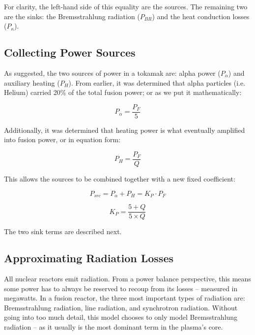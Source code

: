 \documentclass[11pt]{book}
\begin{document}
For clarity, the left-hand side of this equality are the sources. The remaining two are the sinks: the Bremsstrahlung radiation ($P_{BR}$) and the heat conduction losses ($P_\kappa$).

\subsection{Collecting Power Sources}

As suggested, the two sources of power in a tokamak are: alpha power ($P_\alpha$) and auxiliary heating ($P_H$). From earlier, it was determined that alpha particles (i.e. Helium) carried 20\% of the total fusion power; or as we put it mathematically:

\begin{equation}
	\label{eq:palpha}
	P_\alpha = \frac{P_F}{5}
\end{equation}

Additionally, it was determined that heating power is what eventually amplified into fusion power, or in equation form:

\begin{equation}
	\label{eq:ph}
	P_H = \frac{P_F}{Q}
\end{equation}

This allows the sources to be combined together with a new fixed coefficient:

\begin{equation}
	P_{src} = P_\alpha + P_H = K_P \cdot P_F
\end{equation}

\begin{equation}
	K_P = \frac{5 + Q}{5 \times Q}
\end{equation}

The two sink terms are described next.

\subsection{Approximating Radiation Losses}

All nuclear reactors emit radiation. From a power balance perspective, this means some power has to always be reserved to recoup from its losses -- measured in megawatts. In a fusion reactor, the three most important types of radiation are: Bremsstrahlung radiation, line radiation, and synchrotron radiation. Without going into too much detail, this model chooses to only model Bremsstrahlung radiation -- as it usually is the most dominant term in the plasma's core.
\end{document}
